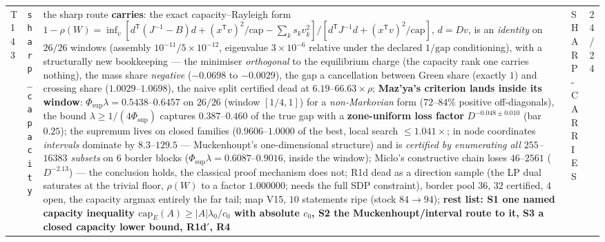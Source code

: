\documentclass[11pt,a4paper]{article}
\begin{document}
{\begin{xltabular}{\linewidth}{@{}p{0.95cm} >{\raggedright\arraybackslash}p{3.1cm} Y >{\raggedright\scriptsize\arraybackslash}p{3.35cm} p{1.15cm}@{}}
T143 & \texttt{\scriptsize sharp\_\allowbreak capacity} & the sharp route \textbf{carries}: the exact capacity--Rayleigh form $1-\rho(W)=\inf_v[d^{\mathsf T}(J^{-1}-B)d+(x^{\mathsf T}v)^2/\mathrm{cap}-\sum_ks_kv_k^2]/[d^{\mathsf T}J^{-1}d+(x^{\mathsf T}v)^2/\mathrm{cap}]$, $d=Dv$, is an \emph{identity} on $26/26$ windows (assembly $10^{-11}$/$5\times10^{-12}$, eigenvalue $3\times10^{-6}$ relative under the declared $1/\mathrm{gap}$ conditioning), with a structurally new bookkeeping --- the minimiser \emph{orthogonal} to the equilibrium charge (the capacity rank one carries nothing), the mass share \emph{negative} ($-0.0698$ to $-0.0029$), the gap a cancellation between Green share (exactly $1$) and crossing share ($1.0029$--$1.0698$), the naive split certified dead at $6.19$--$66.63\times\rho$; \textbf{Maz'ya's criterion lands inside its window}: $\Phi_{\sup}\lambda=0.5438$--$0.6457$ on $26/26$ (window $[1/4,1]$) for a \emph{non-Markovian} form ($72$--$84\%$ positive off-diagonals), the bound $\lambda\ge1/(4\Phi_{\sup})$ captures $0.387$--$0.460$ of the true gap with a \textbf{zone-uniform loss factor} $D^{-0.048\pm0.010}$ (bar $0.25$); the supremum lives on closed families ($0.9606$--$1.0000$ of the best, local search $\le1.041\times$; in node coordinates \emph{intervals} dominate by $8.3$--$129.5$ --- Muckenhoupt's one-dimensional structure) and is \emph{certified by enumerating all $255$--$16383$ subsets} on $6$ border blocks ($\Phi_{\sup}\lambda=0.6087$--$0.9016$, inside the window); Miclo's constructive chain loses $46$--$2561$ ($D^{-2.13}$) --- the conclusion holds, the classical proof mechanism does not; R1d dead as a direction sample (the LP dual saturates at the trivial floor, $\rho(W)$ to a factor $1.000000$; needs the full SDP constraint), border pool $36$, $32$ certified, $4$ open, the capacity argmax entirely the far tail; map V15, $10$ statements ripe (stock $84\to94$); \textbf{rest list: S1 one named capacity inequality $\mathrm{cap}_E(A)\ge|A|\lambda_0/c_0$ with absolute $c_0$, S2 the Muckenhoupt/interval route to it, S3 a closed capacity lower bound, R1d$'$, R4} & SHARP-CARRIES & 24/24\\

\end{xltabular}}
\end{document}
